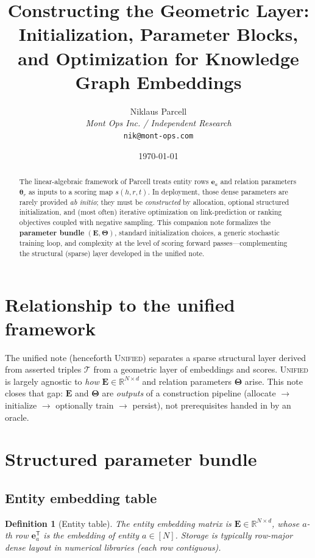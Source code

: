 \documentclass[11pt]{article}
\title{Constructing the Geometric Layer:\\
Initialization, Parameter Blocks, and Optimization for Knowledge Graph Embeddings}
\author{Niklaus Parcell\\
\textit{Mont Ops Inc. / Independent Research}\\
\texttt{nik@mont-ops.com}}
\date{\today}
\newtheorem{definition}{Definition}
\begin{document}
\maketitle

\begin{abstract}
The linear-algebraic framework of Parcell \cite{UnifiedNote} treats entity rows $\bm{e}_a$ and relation parameters $\bm{\theta}_r$ as inputs to a scoring map $s(h,r,t)$.
In deployment, those dense parameters are rarely provided \emph{ab initio}; they must be \emph{constructed} by allocation, optional structured initialization, and (most often) iterative optimization on link-prediction or ranking objectives coupled with negative sampling.
This companion note formalizes the \textbf{parameter bundle} $(\bm{E}, \bm{\Theta})$, standard initialization choices, a generic stochastic training loop, and complexity at the level of scoring forward passes---complementing the structural (sparse) layer developed in the unified note.
\end{abstract}

\section{Relationship to the unified framework}
The unified note (henceforth \textsc{Unified}) separates a sparse structural layer derived from asserted triples $\mathcal{T}$ from a geometric layer of embeddings and scores.
\textsc{Unified} is largely agnostic to \emph{how} $\bm{E} \in \mathbb{R}^{N \times d}$ and relation parameters $\bm{\Theta}$ arise.
This note closes that gap: $\bm{E}$ and $\bm{\Theta}$ are \emph{outputs} of a construction pipeline (allocate $\to$ initialize $\to$ optionally train $\to$ persist), not prerequisites handed in by an oracle.

\section{Structured parameter bundle}

\subsection{Entity embedding table}
\begin{definition}[Entity table]
The \emph{entity embedding matrix} is $\bm{E} \in \mathbb{R}^{N \times d}$, whose $a$-th row $\bm{e}_a^{\mathsf{T}}$ is the embedding of entity $a \in [N]$.
Storage is typically \emph{row-major} dense layout in numerical libraries (each row contiguous).
\end{definition}
\end{document}
